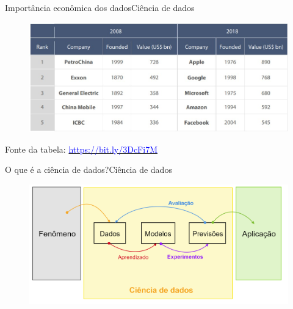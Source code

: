 \documentclass[t]{beamer}
\begin{document}

\begin{ftst}{Importância econômica dos dados}{Ciência de dados}
\begin{figure}
    \centering
    \includegraphics[scale=0.5]{Figuras/slide00_05.jpg}
\end{figure}
\vone
\vone
\vone
\scriptsize
Fonte da tabela: \href{https://bit.ly/3DcFi7M}{\textcolor{blue}{https://bit.ly/3DcFi7M}}

\end{ftst}


\begin{ftst}{O que é a ciência de dados?}{Ciência de dados}

\vone
\begin{figure}
    \centering
    \includegraphics[scale=0.17]{Figuras/slide00_06.png}
\end{figure}
\end{ftst}

\end{document}
